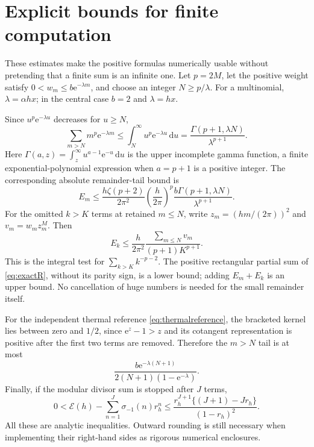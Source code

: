 \documentclass[11pt,a4paper]{article}
\newcommand{\ee}{\mathrm e}
\newcommand{\dd}{\,\mathrm d}
\newcommand{\E}{\mathcal E}
\numberwithin{equation}{section}
\theoremstyle{plain}
\theoremstyle{definition}
\theoremstyle{remark}
\begin{document}
\appendix
\section{Explicit bounds for finite computation}
\label{app:tails}

These estimates make the positive formulas numerically usable without
pretending that a finite sum is an infinite one. Let $p=2M$, let the positive
weight satisfy $0<w_m\le b\ee^{-\lambda m}$, and choose an integer
$N\ge p/\lambda$. For a multinomial, $\lambda=\alpha hx$; in the central
case $b=2$ and $\lambda=hx$.

Since $u^p\ee^{-\lambda u}$ decreases for $u\ge N$,
\begin{equation}
 \sum_{m>N}m^p\ee^{-\lambda m}
 \le\int_N^\infty u^p\ee^{-\lambda u}\dd u
 =\frac{\Gamma(p+1,\lambda N)}{\lambda^{p+1}}.
 \label{eq:mtail}
\end{equation}
Here $\Gamma(a,z)=\int_z^\infty u^{a-1}\ee^{-u}\dd u$ is the upper incomplete
gamma function, a finite exponential-polynomial expression when $a=p+1$
is a positive integer. The corresponding absolute remainder-tail bound is
\begin{equation}
 E_m\le
 \frac{h\zeta(p+2)}{2\pi^2}
      \left(\frac h{2\pi}\right)^p
      \frac{b\Gamma(p+1,\lambda N)}{\lambda^{p+1}}.
 \label{eq:Rmtail}
\end{equation}
For the omitted $k>K$ terms at retained $m\le N$, write
$z_m=(hm/(2\pi))^2$ and $v_m=w_m z_m^M$. Then
\begin{equation}
 E_k\le\frac h{2\pi^2}
           \frac{\sum_{m\le N}v_m}{(p+1)K^{p+1}}.
 \label{eq:Rktail}
\end{equation}
This is the integral test for $\sum_{k>K}k^{-p-2}$. The positive rectangular
partial sum of \eqref{eq:exactR}, without its parity sign, is a lower bound;
adding $E_m+E_k$ is an upper bound. No cancellation of huge numbers is needed
for the small remainder itself.

For the independent thermal reference \eqref{eq:thermalreference}, the
bracketed kernel lies between zero and $1/2$, since
$\ee^z-1>z$ and its cotangent representation is positive after the first two
terms are removed. Therefore the $m>N$ tail is at most
\begin{equation}
 \frac{b\ee^{-\lambda(N+1)}}{2(N+1)(1-\ee^{-\lambda})}.
 \label{eq:Ftail}
\end{equation}
Finally, if the modular divisor sum is stopped after $J$ terms,
\begin{equation}
 0<\E(h)-\sum_{n=1}^{J}\sigma_{-1}(n)r_h^n
 \le\frac{r_h^{J+1}\{(J+1)-Jr_h\}}{(1-r_h)^2}.
 \label{eq:Etail}
\end{equation}
All these are analytic inequalities. Outward rounding is still necessary
when implementing their right-hand sides as rigorous numerical enclosures.
\end{document}
